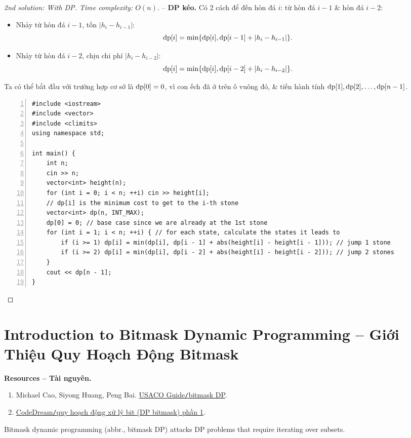 \documentclass{article}
\begin{document}
\begin{proof}[2nd solution: With DP. Time complexity: $O(n)$]
    -- {\bf DP kéo.} Có 2 cách để đến hòn đá $i$: từ hòn đá $i - 1$ \& hòn đá $i - 2$:
    \begin{itemize}
        \item Nhảy từ hòn đá $i - 1$, tốn $|h_i - h_{i-1}|$:
        \begin{equation*}
            {\rm dp}[i] = \min\{{\rm dp}[i],{\rm dp}[i - 1] + |h_i - h_{i-1}|\}.
        \end{equation*}
        \item Nhảy từ hòn đá $i - 2$, chịu chi phí $|h_i - h_{i-2}|$:
        \begin{equation*}
            {\rm dp}[i] = \min\{{\rm dp}[i],{\rm dp}[i - 2] + |h_i - h_{i-2}|\}.
        \end{equation*}
    \end{itemize}
    Ta có thể bắt đầu với trường hợp cơ sở là ${\rm dp}[0] = 0$, vì con ếch đã ở trên ô vuông đó, \& tiến hành tính ${\rm dp}[1],{\rm dp}[2],\ldots,{\rm dp}[n - 1]$.
    \begin{Verbatim}[numbers=left,xleftmargin=5mm]
#include <iostream>
#include <vector>
#include <climits>
using namespace std;

int main() {
    int n;
    cin >> n;
    vector<int> height(n);
    for (int i = 0; i < n; ++i) cin >> height[i];
    // dp[i] is the minimum cost to get to the i-th stone
    vector<int> dp(n, INT_MAX);
    dp[0] = 0; // base case since we are already at the 1st stone
    for (int i = 1; i < n; ++i) { // for each state, calculate the states it leads to
        if (i >= 1) dp[i] = min(dp[i], dp[i - 1] + abs(height[i] - height[i - 1])); // jump 1 stone
        if (i >= 2) dp[i] = min(dp[i], dp[i - 2] + abs(height[i] - height[i - 2])); // jump 2 stones
    }
    cout << dp[n - 1];
}
    \end{Verbatim}
\end{proof}


\section{Introduction to Bitmask Dynamic Programming -- Giới Thiệu Quy Hoạch Động Bitmask}
\textbf{\textsf{Resources -- Tài nguyên.}}
\begin{enumerate}
    \item {\sc Michael Cao, Siyong Huang, Peng Bai}. \href{https://usaco.guide/gold/dp-bitmasks}{USACO Guide{\tt/}bitmask DP}.

    \item \href{https://codedream.edu.vn/bitmask_1/}{CodeDream{\tt/}quy hoạch động xử lý bit (DP bitmask) phần 1}.
\end{enumerate}
Bitmask dynamic programming (abbr., bitmask DP) attacks DP problems that require iterating over subsets.
\end{document}

